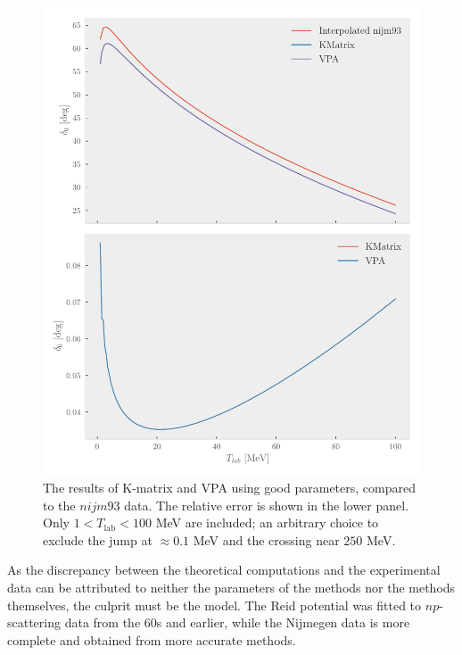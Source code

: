 \begin{figure}[ht!]
  \centering
  \includegraphics[]{Figures/vpa_kmatrix_compare.pdf}
  \caption{\label{fig:vpa_matrix_compare}The results of K-matrix and VPA using
    good parameters, compared to the \(nijm93\) data. The relative error is
    shown in the lower panel. Only \mbox{\(1 < T_{\mathrm{lab}} < 100\)} MeV are
    included; an arbitrary choice to exclude the jump at \(\approx 0.1 \) MeV
    and the crossing near \(250\) MeV.}
\end{figure}

As the
discrepancy between the theoretical computations and the experimental data can
be attributed to neither the parameters of the methods nor the methods
themselves, the culprit must be the model. The Reid potential was fitted to
\(np\)-scattering data from the \(60\)s and earlier, while the Nijmegen data is
more complete and obtained from more accurate methods.



